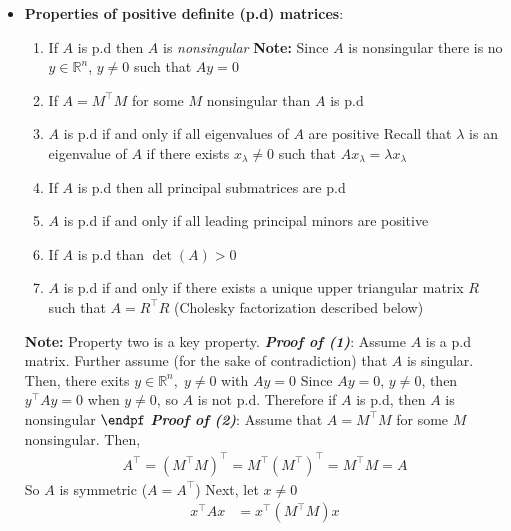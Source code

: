 \documentclass{report}
\begin{document}
\begin{itemize}
        \item \textbf{Properties of positive definite (p.d) matrices}:
            \begin{enumerate}
                \item If $A$ is p.d then $A$ is \textit{nonsingular}
                    \bigbreak \noindent 
                    \textbf{Note:} Since $A$ is nonsingular there is no $y \in \mathbb{R}^{n}$, $y\ne 0$ such that $Ay = 0$
                \item If $A = M^{\top}M$ for some $M$ nonsingular than $A$ is p.d
                \item $A$ is p.d if and only if all eigenvalues of $A$ are positive
                    \bigbreak \noindent 
                    Recall that $\lambda$ is an eigenvalue of $A$ if there exists $x_{\lambda} \ne 0$ such that $Ax_{\lambda}  = \lambda x_{\lambda}$
                \item If $A$ is p.d then all principal submatrices are p.d
                \item $A$ is p.d if and only if all leading principal minors are positive
                \item If $A$ is p.d than $\det(A) > 0$
                \item $A$ is p.d if and only if there exists a unique upper triangular matrix $R$ such that $A = R^{\top}R$ (Cholesky factorization described below)
            \end{enumerate}
            \textbf{Note:} Property two is a key property.
            \bigbreak \noindent 
            \textbf{\textit{Proof of (1)}}: Assume $A$ is a p.d matrix. Further assume (for the sake of contradiction) that $A$ is singular. Then, there exits $y \in \mathbb{R}^{n},\; y \ne 0 $ with $Ay=0$
            \bigbreak \noindent 
            Since $Ay = 0$, $y\ne 0$, then $y^{\top}Ay=0$ when $y\ne 0$, so $A$ is not p.d.
            \bigbreak \noindent 
            Therefore if $A$ is p.d, then $A$ is nonsingular $\endpf$
            \bigbreak \noindent 
            \textbf{\textit{Proof of (2)}}: Assume that $A  = M^{\top}M$ for some $M$ nonsingular. Then,
            \begin{align*}
                A^{\top} = (M^{\top}M)^{\top} = M^{\top}(M^{\top})^{\top} = M^{\top}M = A
            \end{align*}
            So $A$ is symmetric ($A = A^{\top}$)
            \bigbreak \noindent 
            Next, let $x \ne 0$
            \begin{align*}
                x^{\top}Ax &= x^{\top}(M^{\top}M)x \\

\end{align*}
\end{itemize}
\end{document}
